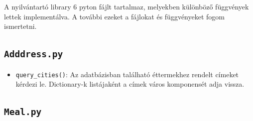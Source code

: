 A nyilvántartó library 6 pyton fájlt tartalmaz, melyekben különböző függvények lettek implementálva. A további ezeket a fájlokat és függvényeket fogom ismertetni.

\subsection{\texttt{Adddress.py}}

\begin{itemize}
    \item \texttt{query\_cities()}: Az adatbázisban található éttermekhez rendelt címeket kérdezi le. Dictionary-k listájaként a címek város komponensét adja vissza.
\end{itemize}

\subsection{\texttt{Meal.py}}

